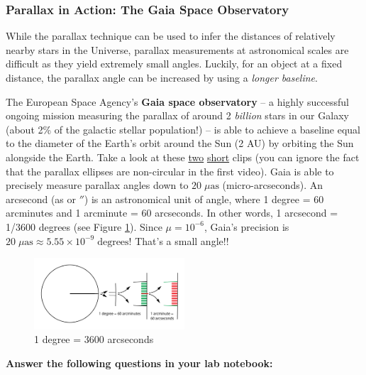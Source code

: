 \documentclass[11pt]{article}
\begin{document}
\subsubsection{Parallax in Action: The Gaia Space Observatory}

While the parallax technique can be used to infer the distances of relatively nearby stars in the Universe, parallax measurements at astronomical scales are difficult as they yield extremely small angles. Luckily, for an object at a fixed distance, the parallax angle can be increased by using a \emph{longer baseline}. 

The European Space Agency's \textbf{Gaia space observatory} -- a highly successful ongoing mission measuring the parallax of around 2 \emph{billion} stars in our Galaxy (about 2\% of the galactic stellar population!) -- is able to achieve a baseline equal to the diameter of the Earth's orbit around the Sun (2 AU) by orbiting the Sun alongside the Earth. Take a look at these \href{https://youtu.be/m1ZNSPrH0q8?t=168}{two} \href{https://www.youtube.com/watch?v=0-jhyRIupY4}{short} clips (you can ignore the fact that the parallax ellipses are non-circular in the first video). Gaia is able to precisely measure parallax angles down to $20\;\mu\mathrm{as}$ (micro-arcseconds). An arcsecond (as or $''$) is an astronomical unit of angle, where 1 degree = 60 arcminutes and 1 arcminute = 60 arcseconds. In other words, 1 arcsecond = 1/3600 degrees (see Figure \ref{fig:arcunits}). Since $\mu = 10^{-6}$, Gaia's precision is $20\;\mu\mathrm{as}\approx 5.55\times 10^{-9}\;\mathrm{degrees}$! That's a small angle!!

\begin{figure}
    \centering
    \includegraphics[width=0.5\textwidth]{blog014-image001-degree-arcmin-arcsec.png}
    \caption{1 degree = 3600 arcseconds}
    \label{fig:arcunits}
\end{figure}


\textbf{Answer the following questions in your lab notebook:}
\end{document}
